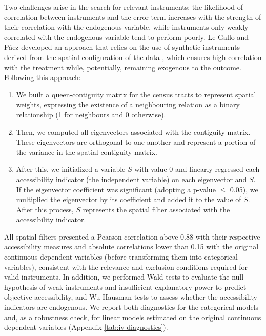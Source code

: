 \documentclass[preprint, 3p,
authoryear]{elsarticle} %
\providecommand{\tightlist}{%
  \setlength{\itemsep}{0pt}\setlength{\parskip}{0pt}}
\begin{document}
Two challenges arise in the search for relevant instruments: the
likelihood of correlation between instruments and the error term
increases with the strength of their correlation with the endogenous
variable, while instruments only weakly correlated with the endogenous
variable tend to perform poorly. Le Gallo and Páez
\citeyearpar{legallo2013} developed an approach that relies on the use
of synthetic instruments derived from the spatial configuration of the
data \citep[see][]{getis_comparative_2002, griffith_spatial_2003}, which
ensures high correlation with the treatment while, potentially,
remaining exogenous to the outcome. Following this approach:

\begin{enumerate}
\def\labelenumi{\arabic{enumi}.}
\tightlist
\item
  We built a queen-contiguity matrix for the census tracts to represent
  spatial weights, expressing the existence of a neighbouring relation
  as a binary relationship (1 for neighbours and 0 otherwise).
\item
  Then, we computed all eigenvectors associated with the contiguity
  matrix. These eigenvectors are orthogonal to one another and represent
  a portion of the variance in the spatial contiguity matrix.
\item
  After this, we initialized a variable \(S\) with value \(0\) and
  linearly regressed each accessibility indicator (the independent
  variable) on each eigenvector and \(S\). If the eigenvector
  coefficient was significant (adopting a p-value \(\leq\) 0.05), we
  multiplied the eigenvector by its coefficient and added it to the
  value of \(S\). After this process, \(S\) represents the spatial
  filter associated with the accessibility indicator.
\end{enumerate}

All spatial filters presented a Pearson correlation above 0.88 with
their respective accessibility measures and absolute correlations lower
than 0.15 with the original continuous dependent variables (before
transforming them into categorical variables), consistent with the
relevance and exclusion conditions required for valid instruments. In
addition, we performed Wald tests to evaluate the null hypothesis of
weak instruments and insufficient explanatory power to predict objective
accessibility, and Wu-Hausman tests to assess whether the accessibility
indicators are endogenous. We report both diagnostics for the
categorical models and, as a robustness check, for linear models
estimated on the original continuous dependent variables (Appendix
\ref{tab:iv-diagnostics}).
\end{document}
